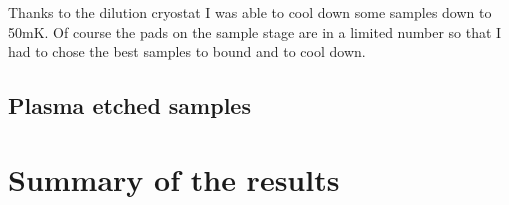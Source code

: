                 Thanks to the dilution cryostat I was able to cool down some samples down to 50mK. Of course the pads on the sample stage are in a limited number so that I had to chose the best samples to bound and to cool down.
                
                
                
                \subsection{Plasma etched samples}
                
                
                
                \section{Summary of the results}
                
                
                
                
        
                
                
                
                
                
                
        
